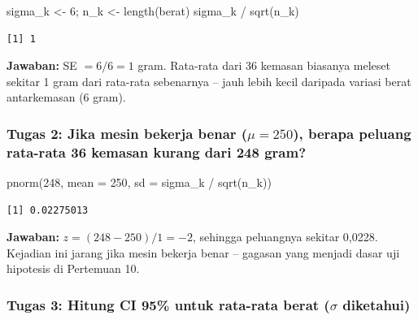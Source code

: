 \documentclass[
  indonesian,
  letterpaper,
]{book}
\newenvironment{Shaded}{\begin{snugshade}}{\end{snugshade}}
\newcommand{\AttributeTok}[1]{\textcolor[rgb]{0.40,0.45,0.13}{#1}}
\newcommand{\DecValTok}[1]{\textcolor[rgb]{0.68,0.00,0.00}{#1}}
\newcommand{\FunctionTok}[1]{\textcolor[rgb]{0.28,0.35,0.67}{#1}}
\newcommand{\NormalTok}[1]{\textcolor[rgb]{0.00,0.23,0.31}{#1}}
\newcommand{\OtherTok}[1]{\textcolor[rgb]{0.00,0.23,0.31}{#1}}
\newcommand{\SpecialCharTok}[1]{\textcolor[rgb]{0.37,0.37,0.37}{#1}}
\begin{document}
\begin{Shaded}
\begin{Highlighting}[]
\NormalTok{sigma\_k }\OtherTok{\textless{}{-}} \DecValTok{6}\NormalTok{; n\_k }\OtherTok{\textless{}{-}} \FunctionTok{length}\NormalTok{(berat)}
\NormalTok{sigma\_k }\SpecialCharTok{/} \FunctionTok{sqrt}\NormalTok{(n\_k)}
\end{Highlighting}
\end{Shaded}

\begin{verbatim}
[1] 1
\end{verbatim}

\textbf{Jawaban:} SE \(= 6/6 = 1\) gram. Rata-rata dari 36 kemasan
biasanya meleset sekitar 1 gram dari rata-rata sebenarnya -- jauh lebih
kecil daripada variasi berat antarkemasan (6 gram).

\subsubsection{\texorpdfstring{Tugas 2: Jika mesin bekerja benar
(\(\mu = 250\)), berapa peluang rata-rata 36 kemasan kurang dari 248
gram?}{Tugas 2: Jika mesin bekerja benar (\textbackslash mu = 250), berapa peluang rata-rata 36 kemasan kurang dari 248 gram?}}\label{tugas-2-jika-mesin-bekerja-benar-mu-250-berapa-peluang-rata-rata-36-kemasan-kurang-dari-248-gram}

\begin{Shaded}
\begin{Highlighting}[]
\FunctionTok{pnorm}\NormalTok{(}\DecValTok{248}\NormalTok{, }\AttributeTok{mean =} \DecValTok{250}\NormalTok{, }\AttributeTok{sd =}\NormalTok{ sigma\_k }\SpecialCharTok{/} \FunctionTok{sqrt}\NormalTok{(n\_k))}
\end{Highlighting}
\end{Shaded}

\begin{verbatim}
[1] 0.02275013
\end{verbatim}

\textbf{Jawaban:} \(z = (248 - 250)/1 = -2\), sehingga peluangnya
sekitar 0,0228. Kejadian ini jarang jika mesin bekerja benar -- gagasan
yang menjadi dasar uji hipotesis di Pertemuan 10.

\subsubsection{\texorpdfstring{Tugas 3: Hitung CI 95\% untuk rata-rata
berat (\(\sigma\)
diketahui)}{Tugas 3: Hitung CI 95\% untuk rata-rata berat (\textbackslash sigma diketahui)}}\label{tugas-3-hitung-ci-95-untuk-rata-rata-berat-sigma-diketahui}
\end{document}
